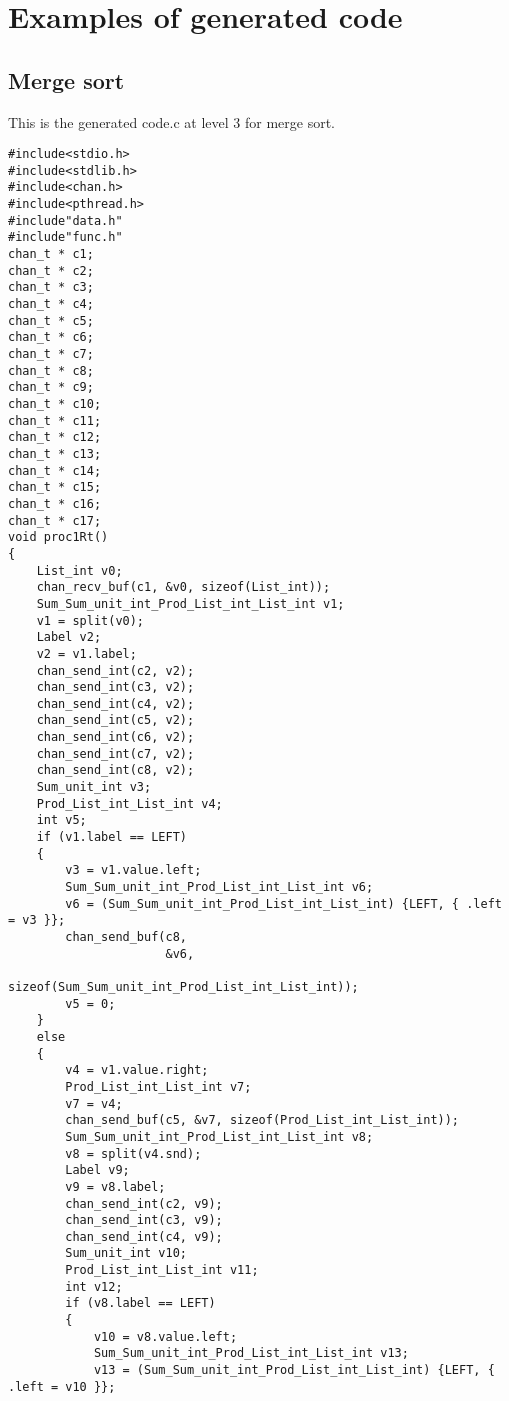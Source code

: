\appendix
\chapter{Examples of generated code} \label{chap:egc}
\section{Merge sort}
This is the generated code.c at level 3 for merge sort.
\lstset{basicstyle=\tiny,style=myCustomMatlabStyle}
\begin{lstlisting}
#include<stdio.h>
#include<stdlib.h>
#include<chan.h>
#include<pthread.h>
#include"data.h"
#include"func.h"
chan_t * c1;
chan_t * c2;
chan_t * c3;
chan_t * c4;
chan_t * c5;
chan_t * c6;
chan_t * c7;
chan_t * c8;
chan_t * c9;
chan_t * c10;
chan_t * c11;
chan_t * c12;
chan_t * c13;
chan_t * c14;
chan_t * c15;
chan_t * c16;
chan_t * c17;
void proc1Rt()
{
    List_int v0;
    chan_recv_buf(c1, &v0, sizeof(List_int));
    Sum_Sum_unit_int_Prod_List_int_List_int v1;
    v1 = split(v0);
    Label v2;
    v2 = v1.label;
    chan_send_int(c2, v2);
    chan_send_int(c3, v2);
    chan_send_int(c4, v2);
    chan_send_int(c5, v2);
    chan_send_int(c6, v2);
    chan_send_int(c7, v2);
    chan_send_int(c8, v2);
    Sum_unit_int v3;
    Prod_List_int_List_int v4;
    int v5;
    if (v1.label == LEFT)
    {
        v3 = v1.value.left;
        Sum_Sum_unit_int_Prod_List_int_List_int v6;
        v6 = (Sum_Sum_unit_int_Prod_List_int_List_int) {LEFT, { .left = v3 }};
        chan_send_buf(c8,
                      &v6,
                      sizeof(Sum_Sum_unit_int_Prod_List_int_List_int));
        v5 = 0;
    }
    else
    {
        v4 = v1.value.right;
        Prod_List_int_List_int v7;
        v7 = v4;
        chan_send_buf(c5, &v7, sizeof(Prod_List_int_List_int));
        Sum_Sum_unit_int_Prod_List_int_List_int v8;
        v8 = split(v4.snd);
        Label v9;
        v9 = v8.label;
        chan_send_int(c2, v9);
        chan_send_int(c3, v9);
        chan_send_int(c4, v9);
        Sum_unit_int v10;
        Prod_List_int_List_int v11;
        int v12;
        if (v8.label == LEFT)
        {
            v10 = v8.value.left;
            Sum_Sum_unit_int_Prod_List_int_List_int v13;
            v13 = (Sum_Sum_unit_int_Prod_List_int_List_int) {LEFT, { .left = v10 }};

\end{lstlisting}

